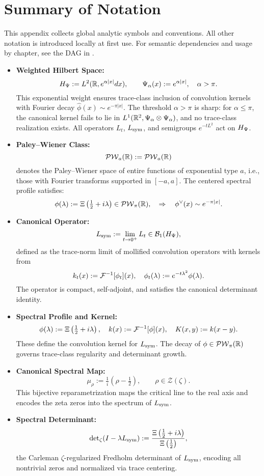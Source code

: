 \section{Summary of Notation}
\label{app:notation_summary}

\noindent
This appendix collects global analytic symbols and conventions. All other notation is introduced locally at first use. For semantic dependencies and usage by chapter, see the DAG in .

\begin{itemize}
  \item \textbf{Weighted Hilbert Space:}
  \[
  H_{\Psi} := L^2(\mathbb{R}, e^{\alpha |x|} dx), \qquad \Psi_\alpha(x) := e^{\alpha |x|}, \quad \alpha > \pi.
  \]
  This exponential weight ensures trace-class inclusion of convolution kernels with Fourier decay \( \widehat{\phi}(x) \sim e^{-\pi |x|} \). The threshold \( \alpha > \pi \) is sharp: for \( \alpha \le \pi \), the canonical kernel fails to lie in \( L^1(\mathbb{R}^2, \Psi_\alpha \otimes \Psi_\alpha) \), and no trace-class realization exists. All operators \( L_t \), \( L_{\mathrm{sym}} \), and semigroups \( e^{-tL^2} \) act on \( H_{\Psi} \).

  \item \textbf{Paley–Wiener Class:}
  \[
  \mathcal{PW}_{a}(\mathbb{R}) := \mathcal{PW}_a(\mathbb{R})
  \]
  denotes the Paley–Wiener space of entire functions of exponential type \( a \), i.e., those with Fourier transforms supported in \( [-a, a] \). The centered spectral profile satisfies:
  \[
  \phi(\lambda) := \Xi\left( \tfrac{1}{2} + i\lambda \right) \in \mathcal{PW}_{\pi}(\mathbb{R}), \quad \Rightarrow \quad \phi^\vee(x) \sim e^{-\pi |x|}.
  \]

  \item \textbf{Canonical Operator:}
  \[
  L_{\mathrm{sym}} := \lim_{t \to 0^+} L_t \in \mathcal{B}_1(H_{\Psi}),
  \]
  defined as the trace-norm limit of mollified convolution operators with kernels from
  \[
  k_t(x) := \mathcal{F}^{-1}[\phi_t](x), \quad \phi_t(\lambda) := e^{-t\lambda^2} \phi(\lambda).
  \]
  The operator is compact, self-adjoint, and satisfies the canonical determinant identity.

  \item \textbf{Spectral Profile and Kernel:}
  \[
  \phi(\lambda) := \Xi\left( \tfrac{1}{2} + i\lambda \right), \quad
  k(x) := \mathcal{F}^{-1}[\phi](x), \quad
  K(x, y) := k(x - y).
  \]
  These define the convolution kernel for \( L_{\mathrm{sym}} \). The decay of \( \phi \in \mathcal{PW}_{\pi}(\mathbb{R}) \) governs trace-class regularity and determinant growth.

  \item \textbf{Canonical Spectral Map:}
  \[
  \mu_\rho := \tfrac{1}{i}(\rho - \tfrac{1}{2}), \qquad
  \rho \in \mathcal{Z}(\zeta).
  \]
  This bijective reparametrization maps the critical line to the real axis and encodes the zeta zeros into the spectrum of \( L_{\mathrm{sym}} \).

  \item \textbf{Spectral Determinant:}
  \[
  \det\nolimits_{\zeta}(I - \lambda L_{\mathrm{sym}}) := \frac{\Xi\left( \tfrac{1}{2} + i\lambda \right)}{\Xi\left( \tfrac{1}{2} \right)},
  \]
  the Carleman \(\zeta\)-regularized Fredholm determinant of \( L_{\mathrm{sym}} \), encoding all nontrivial zeros and normalized via trace centering.
\end{itemize}

